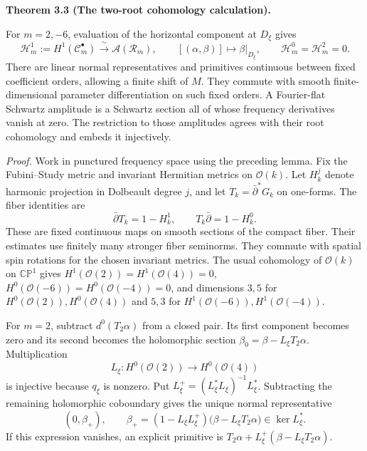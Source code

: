 \documentclass[
  english,
  11pt,
  reqno]{amsart}
\makeatletter
\newcommand{\pandocstatementheading}[1]{%
  \par\if@nobreak\else
    \addpenalty{\@beginparpenalty}%
    \addvspace{.5\baselineskip plus .2\baselineskip minus .2\baselineskip}%
  \fi
  {\normalfont\bfseries #1\par}%
  \nobreak\@afterindenttrue\@afterheading
}
\makeatother
\begin{document}
\pandocstatementheading{\leavevmode{}\label{thm:online-moderate-root-cohomology}Theorem 3.3 (The two-root cohomology calculation).}

For \(m=2,-6\), evaluation of the horizontal component at \(D_\xi\)
gives%
 \[
\mathscr H_m^1:=H^1(\mathscr C_m^\bullet)
\xrightarrow{\ \sim\ }\mathscr A(\mathcal R_m),
\qquad[(\alpha,\beta)]\longmapsto\beta|_{D_\xi},
\qquad
\mathscr H_m^0=\mathscr H_m^2=0.
\] There are linear normal representatives and primitives continuous
between fixed coefficient orders, allowing a finite shift of \(M\). They
commute with smooth finite-dimensional parameter differentiation on such
fixed orders. A Fourier-flat Schwartz amplitude is a Schwartz section
all of whose frequency derivatives vanish at zero. The restriction to
those amplitudes agrees with their root cohomology and embeds it
injectively.

\emph{Proof.} Work in punctured frequency space using the preceding
lemma. Fix the Fubini--Study metric and invariant Hermitian metrics on
\(\mathcal O(k)\). Let \(H_k^j\) denote harmonic projection in Dolbeault
degree \(j\), and let \(T_k=\bar\partial^*G_k\) on one-forms. The fiber
identities are%
 \[
\bar\partial T_k=1-H_k^1,
\qquad
T_k\bar\partial=1-H_k^0.
\] These are fixed continuous maps on smooth sections of the compact
fiber. Their estimates use finitely many stronger fiber seminorms. They
commute with spatial spin rotations for the chosen invariant metrics.
The usual cohomology of \(\mathcal O(k)\) on \(\mathbb{CP}^1\) gives
\(H^1(\mathcal O(2))=H^1(\mathcal O(4))=0\),
\(H^0(\mathcal O(-6))=H^0(\mathcal O(-4))=0\), and dimensions \(3,5\)
for \(H^0(\mathcal O(2)),H^0(\mathcal O(4))\) and \(5,3\) for
\(H^1(\mathcal O(-6)),H^1(\mathcal O(-4))\).

For \(m=2\), subtract \(d^0(T_2\alpha)\) from a closed pair. Its first
component becomes zero and its second becomes the holomorphic section
\(\beta_0=\beta-L_\xi T_2\alpha\). Multiplication \[
L_\xi:H^0(\mathcal O(2))\longrightarrow H^0(\mathcal O(4))
\] is injective because \(q_\xi\) is nonzero. Put
\(L_\xi^+=(L_\xi^*L_\xi)^{-1}L_\xi^*\). Subtracting the remaining
holomorphic coboundary gives the unique normal representative%
 \[
(0,\beta_+),
\qquad
\beta_+=(1-L_\xi L_\xi^+)\bigl(\beta-L_\xi T_2\alpha\bigr)
\in\ker L_\xi^*.
\] If this expression vanishes, an explicit primitive is
\(T_2\alpha+L_\xi^+(\beta-L_\xi T_2\alpha)\).
\end{document}
